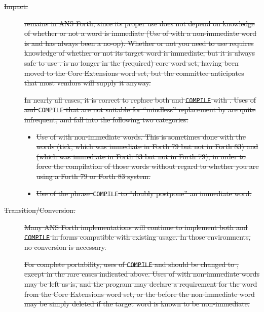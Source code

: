 \begin{description}
\item[\sout{Impact:}]
\sout{%
	\word{[COMPILE]} remains in ANS Forth, since its proper use does
	not depend on knowledge of whether or not a word is immediate (Use
	of \word{[COMPILE]} with a non-immediate word is and has always
	been a no-op). Whether or not you need to use \word{[COMPILE]}
	requires knowledge of whether or not its target word is immediate,
	but it is always safe to use \word{[COMPILE]}. \word{[COMPILE]}
	is no longer in the (required) core word set, having been moved
	to the Core Extensions word set, but the committee anticipates
	that most vendors will supply it anyway.}

\sout{%
	In nearly all cases, it is correct to replace both \word{[COMPILE]}
	and \texttt{COMPILE} with . Uses of \word{[COMPILE]}
	and \texttt{COMPILE} that are not suitable for ``mindless'' replacement
	by  are quite infrequent, and fall into the following
	two categories:}

	\begin{itemize}
	\item \sout{%
Use of \word{[COMPILE]} with non-immediate words. This is
		sometimes done with the words  (tick, which was
		immediate in Forth 79 but not in Forth 83) and 
		(which was immediate in Forth 83 but not in Forth 79), in
		order to force the compilation of those words without regard
		to whether you are using a Forth 79 or Forth 83 system.}

	\item \sout{%
Use of the phrase \texttt{COMPILE} \word{[COMPILE]}
		 to ``doubly postpone'' an immediate word.}
	\end{itemize}

\item[\sout{Transition/Conversion:}]
\sout{%
	Many ANS Forth implementations will continue to implement both
	\word{[COMPILE]} and \texttt{COMPILE} in forms compatible with
	existing usage. In those environments, no conversion is necessary.}

\sout{%
	For complete portability, uses of \texttt{COMPILE} and \word{[COMPILE]}
	should be changed to , except in the rare cases
	indicated above. Uses of \word{[COMPILE]} with non-immediate words
	may be left as-is, and the program may declare a requirement for
	the word \word{[COMPILE]} from the Core Extensions word set, or
	the \word{[COMPILE]} before the non-immediate word may be simply
	deleted if the target word is known to be non-immediate.}


\end{description}
